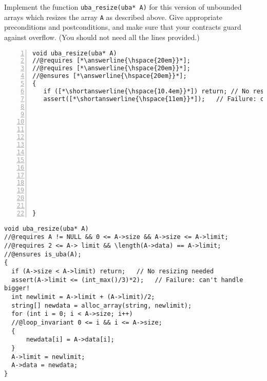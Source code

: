\newpage
{}

Implement the function \lstinline'uba_resize(uba* A)' for this version
of unbounded arrays which resizes the array \lstinline'A' as described
above. Give appropriate preconditions and postconditions, and make
sure that your contracts guard against overflow.
(You should not need all the lines provided.)

\begin{lstlisting}[numbers=left, name="uba_header", aboveskip=0pt, belowskip=0pt, lineskip=1.3ex]
void uba_resize(uba* A)
//@requires [*\answerline{\hspace{20em}}*];
//@requires [*\answerline{\hspace{20em}}*];
//@ensures [*\answerline{\hspace{20em}}*];
{
   if ([*\shortanswerline{\hspace{10.4em}}*]) return; // No resizing needed
   assert([*\shortanswerline{\hspace{11em}}*]);   // Failure: can't handle bigger!














}

\end{lstlisting}

\vspace{-24.2em}
\begin{solution}
\begin{lstlisting}
void uba_resize(uba* A)
//@requires A != NULL && 0 <= A->size && A->size <= A->limit;
//@requires 2 <= A-> limit && \length(A->data) == A->limit;
//@ensures is_uba(A);
{
  if (A->size < A->limit) return;   // No resizing needed
  assert(A->limit <= (int_max()/3)*2);   // Failure: can't handle bigger!
  int newlimit = A->limit + (A->limit)/2;
  string[] newdata = alloc_array(string, newlimit);
  for (int i = 0; i < A->size; i++)
  //@loop_invariant 0 <= i && i <= A->size;
  {
      newdata[i] = A->data[i];
  }
  A->limit = newlimit;
  A->data = newdata;
}
\end{lstlisting}
\end{solution}
